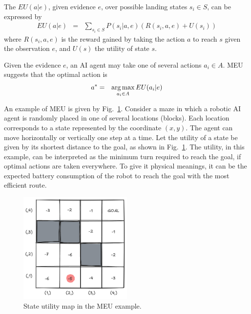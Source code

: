 The  $EU(a|e)$, given evidence $e$, over possible landing states $s_i \in S$, can be expressed by
\begin{eqnarray}
	EU(a|e) &=& \sum_{s_i \in S} P(s_i|a,e) \left(R(s_i,a,e) + U(s_i)\right) \label{eq:expected_utility}
\end{eqnarray}
where $R(s_i,a,e)$ is the reward gained by taking the action $a$ to reach $s$ given the observation $e$, and $U(s)$ the utility of state $s$. 

Given the evidence $e$, an AI agent may take one of several actions $a_i \in A$. MEU suggests that the optimal action is
\begin{eqnarray}
	a^* &=& \operatorname*{arg\,max}_{a_i \in A} EU(a_i|e) \label{eq:emu}
\end{eqnarray}

An example of MEU is given by Fig.~\ref{fig:emuexp}. Consider a maze in which a robotic AI agent is randomly placed in one of several locations (blocks). Each location corresponds to a state represented by the coordinate $(x,y)$. The agent can move horizontally or vertically one step at a time. Let the utility of a state be given by its shortest distance to the goal, as shown in Fig.~\ref{fig:emuexp}. The utility, in this example, can be interpreted as the minimum turn required to reach the goal, if optimal actions are taken everywhere. To give it physical meanings, it can be the expected battery consumption of the robot to reach the goal with the most efficient route.

\begin{figure}[!htb]
	\centering
	\includegraphics[width=0.5\textwidth]{./chapters/part-1/figures/emuexp.png}
	\caption{State utility map in the MEU example.}
	\label{fig:emuexp}
\end{figure}

